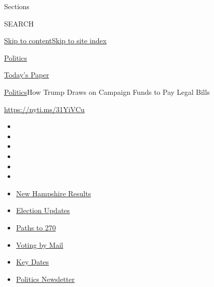 Sections

SEARCH

\protect\hyperlink{site-content}{Skip to
content}\protect\hyperlink{site-index}{Skip to site index}

\href{https://www.nytimes3xbfgragh.onion/section/politics}{Politics}

\href{https://myaccount.nytimes3xbfgragh.onion/auth/login?response_type=cookie\&client_id=vi}{}

\href{https://www.nytimes3xbfgragh.onion/section/todayspaper}{Today's
Paper}

\href{/section/politics}{Politics}\textbar{}How Trump Draws on Campaign
Funds to Pay Legal Bills

\url{https://nyti.ms/31YiVCu}

\begin{itemize}
\item
\item
\item
\item
\item
\item
\end{itemize}

\begin{itemize}
\item
  \href{https://www.nytimes3xbfgragh.onion/interactive/2020/09/08/us/elections/results-new-hampshire-primary-elections.html?action=click\&pgtype=Article\&state=default\&region=TOP_BANNER\&context=storylines_menu}{New
  Hampshire Results}
\item
  \href{https://www.nytimes3xbfgragh.onion/live/2020/09/08/us/trump-vs-biden?action=click\&pgtype=Article\&state=default\&region=TOP_BANNER\&context=storylines_menu}{Election
  Updates}
\item
  \href{https://www.nytimes3xbfgragh.onion/interactive/2020/us/elections/election-states-biden-trump.html?action=click\&pgtype=Article\&state=default\&region=TOP_BANNER\&context=storylines_menu}{Paths
  to 270}
\item
  \href{https://www.nytimes3xbfgragh.onion/interactive/2020/08/31/us/politics/vote-by-mail-deadlines.html?action=click\&pgtype=Article\&state=default\&region=TOP_BANNER\&context=storylines_menu}{Voting
  by Mail}
\item
  \href{https://www.nytimes3xbfgragh.onion/interactive/2019/us/elections/2020-presidential-election-calendar.html?action=click\&pgtype=Article\&state=default\&region=TOP_BANNER\&context=storylines_menu}{Key
  Dates}
\item
  \href{https://www.nytimes3xbfgragh.onion/newsletters/politics?action=click\&pgtype=Article\&state=default\&region=TOP_BANNER\&context=storylines_menu}{Politics
  Newsletter}
\end{itemize}

